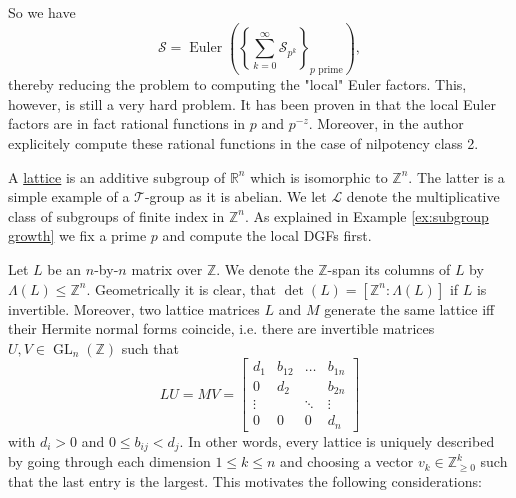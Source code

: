 \begin{exm}
So we have
\begin{equation*}
    \mathcal{S} = \operatorname{Euler} \left( \left\{\sum_{k = 0}^\infty \mathcal{S}_{p^k} \right\}_{p \text{ prime}} \right),
\end{equation*}
thereby reducing the problem to computing the "local" Euler factors.
This, however, is still a very hard problem.
It has been proven in \cite{subgroupsoffiniteindex} that the local Euler factors are in fact rational functions in $p$ and $p^{-z}$.
Moreover, in \cite{vollspaper} the author explicitely compute these rational functions in the case of nilpotency class 2.
\end{exm}

\begin{exm}[Sublattices]
\label{ex:sublattices}
A \ul{lattice} is an additive subgroup of $\mathbb{R}^n$ which is isomorphic to $\mathbb{Z}^n$.
The latter is a simple example of a $\mathcal{T}$-group as it is abelian. We let $\mathcal{L}$ denote the multiplicative class of subgroups of finite index in $\mathbb{Z}^n$. 
As explained in Example \ref{ex:subgroup growth} we fix a prime $p$ and compute the local DGFs first.

Let $L$ be an $n$-by-$n$ matrix over $\mathbb{Z}$. 
We denote the $\mathbb{Z}$-span its columns of $L$ by $\Lambda (L) \leq \mathbb{Z}^n$.
Geometrically it is clear, that $\det(L) = [\mathbb{Z}^n:\Lambda(L)]$ if $L$ is invertible.
Moreover, two lattice matrices $L$ and $M$ generate the same lattice iff their Hermite normal forms coincide, i.e. there are invertible matrices $U, V \in \operatorname{GL}_n(\mathbb{Z})$ such that 
\begin{equation*}
    L U = M V = \begin{bmatrix}
        d_1&    b_{12}& \dots&  b_{1n} \\
        0&      d_2&    &  b_{2n} \\
        \vdots& &      \ddots& \vdots \\
        0&      0&      0&      d_n
    \end{bmatrix}
\end{equation*}
with $d_i > 0$ and $0 \leq b_{ij} < d_j$. 
In other words, every lattice is uniquely described by going through each dimension $1 \leq k \leq n$ and choosing a vector $v_k \in \mathbb{Z}_{\geq 0}^k$ such that the last entry is the largest.
This motivates the following considerations:


\end{exm}
